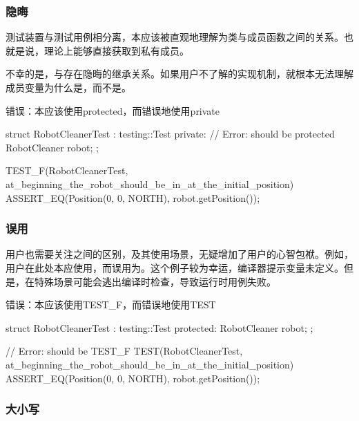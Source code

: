 \begin{content}
\subsubsection{隐晦}

测试装置与测试用例相分离，本应该被直观地理解为类与成员函数之间的关系。也就是说，理论上能够直接获取到私有成员。

不幸的是，与存在隐晦的继承关系。如果用户不了解的实现机制，就根本无法理解成员变量为什么是，而不是。

\begin{nodiff}{错误：本应该使用protected，而错误地使用private}
 \begin{c++}
struct RobotCleanerTest : testing::Test {
private: // Error: should be protected
  RobotCleaner robot;
};
 
TEST_F(RobotCleanerTest, at_beginning_the_robot_should_be_in_at_the_initial_position) {
  ASSERT_EQ(Position(0, 0, NORTH), robot.getPosition());
}
  \end{c++}
\end{nodiff}

\subsubsection{误用}

用户也需要关注之间的区别，及其使用场景，无疑增加了用户的心智包袱。例如，用户在此处本应使用，而误用为。这个例子较为幸运，编译器提示变量未定义。但是，在特殊场景可能会逃出编译时检查，导致运行时用例失败。

\begin{nodiff}{错误：本应该使用TEST\_F，而错误地使用TEST}
 \begin{c++}
struct RobotCleanerTest : testing::Test {
protected:
  RobotCleaner robot;
};

// Error: should be TEST\_F
TEST(RobotCleanerTest, at_beginning_the_robot_should_be_in_at_the_initial_position) {
  ASSERT_EQ(Position(0, 0, NORTH), robot.getPosition());
}
  \end{c++}
\end{nodiff}

\subsubsection{大小写}


\end{content}
